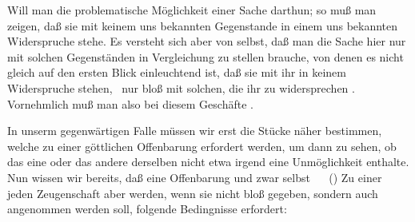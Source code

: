 Will man die problematische Möglichkeit einer Sache darthun; so muß man zeigen, daß sie mit keinem uns bekannten Gegenstande in einem uns bekannten Widerspruche stehe. Es versteht sich aber von selbst, daß man die Sache hier nur mit solchen Gegenständen in Vergleichung zu stellen brauche, von denen es nicht gleich auf den ersten Blick einleuchtend ist, daß sie mit ihr in keinem Widerspruche stehen, \dh\ nur bloß mit solchen, die ihr zu widersprechen . Vornehmlich muß man also bei diesem Geschäfte .\par
In unserm gegenwärtigen Falle müssen wir erst die Stücke näher bestimmen, welche zu einer göttlichen Offenbarung erfordert werden, um dann zu sehen, ob das eine oder das andere derselben nicht etwa irgend eine Unmöglichkeit enthalte. Nun wissen wir bereits, daß eine Offenbarung und zwar selbst ~\  () Zu einer jeden Zeugenschaft aber werden, wenn sie nicht bloß gegeben, sondern auch angenommen werden soll, folgende Bedingnisse erfordert:
